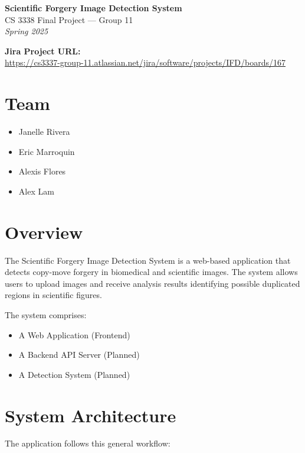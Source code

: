 \documentclass[12pt]{article}
\begin{document}
\begin{center}
    {\LARGE \textbf{Scientific Forgery Image Detection System}} \\[0.5em]
    {\large CS 3338 Final Project --- Group 11} \\[0.3em]
    \textit{Spring 2025}
\end{center}

\vspace{0.5em}
\noindent\textbf{Jira Project URL:} \\
\url{https://cs3337-group-11.atlassian.net/jira/software/projects/IFD/boards/167}

\vspace{1em}

\section{Team}

\begin{itemize}[noitemsep]
    \item Janelle Rivera
    \item Eric Marroquin
    \item Alexis Flores
    \item Alex Lam
\end{itemize}

\section{Overview}

The Scientific Forgery Image Detection System is a web-based application that detects copy-move forgery in biomedical and scientific images. The system allows users to upload images and receive analysis results identifying possible duplicated regions in scientific figures.

The system comprises:
\begin{itemize}[noitemsep]
    \item A Web Application (Frontend)
    \item A Backend API Server (Planned)
    \item A Detection System (Planned)
\end{itemize}

\section{System Architecture}

The application follows this general workflow:
\end{document}
